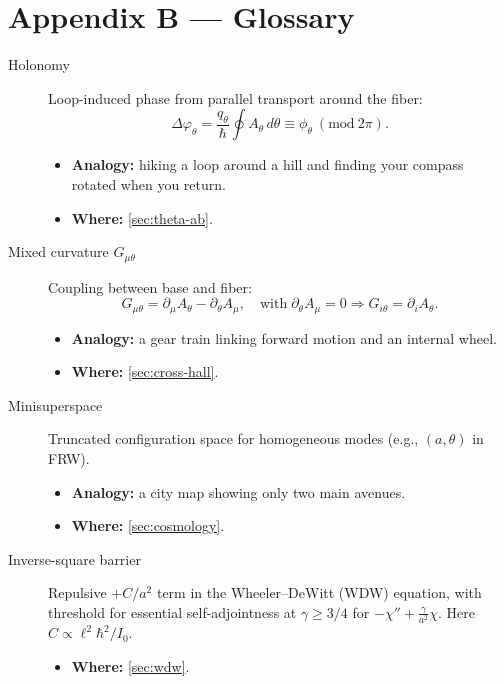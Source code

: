 \section*{Appendix B --- Glossary}\label{sec:appendix-b}
\begin{description}
  \item[Holonomy] Loop-induced phase from parallel transport around the fiber:
  \[
    \Delta\varphi_\theta=\frac{q_\theta}{\hbar}\oint A_\theta\,d\theta \equiv \phi_\theta\ (\mathrm{mod}\ 2\pi).
  \]
  \begin{itemize}
    \item \textbf{Analogy:} hiking a loop around a hill and finding your compass rotated when you return.
    \item \textbf{Where:} \cref{sec:theta-ab}.
  \end{itemize}

  \item[Mixed curvature $G_{\mu\theta}$] Coupling between base and fiber:
  \[
    G_{\mu\theta}=\partial_\mu A_\theta-\partial_\theta A_\mu,\quad \text{with}\; \partial_\theta A_\mu=0\Rightarrow G_{i\theta}=\partial_i A_\theta.
  \]
  \begin{itemize}
    \item \textbf{Analogy:} a gear train linking forward motion and an internal wheel.
    \item \textbf{Where:} \cref{sec:cross-hall}.
  \end{itemize}

  \item[Minisuperspace] Truncated configuration space for homogeneous modes (e.g., $(a,\theta)$ in FRW).
  \begin{itemize}
    \item \textbf{Analogy:} a city map showing only two main avenues.
    \item \textbf{Where:} \cref{sec:cosmology}.
  \end{itemize}

  \item[Inverse-square barrier] Repulsive $+C/a^2$ term in the Wheeler--DeWitt (WDW) equation, with threshold for essential self-adjointness at $\gamma\ge 3/4$ for $-\chi''+\tfrac{\gamma}{a^2}\chi$.
  Here $C\propto \ell^2\hbar^2/I_0$.
  \begin{itemize}
    \item \textbf{Where:} \cref{sec:wdw}.
  \end{itemize}


\end{description}
